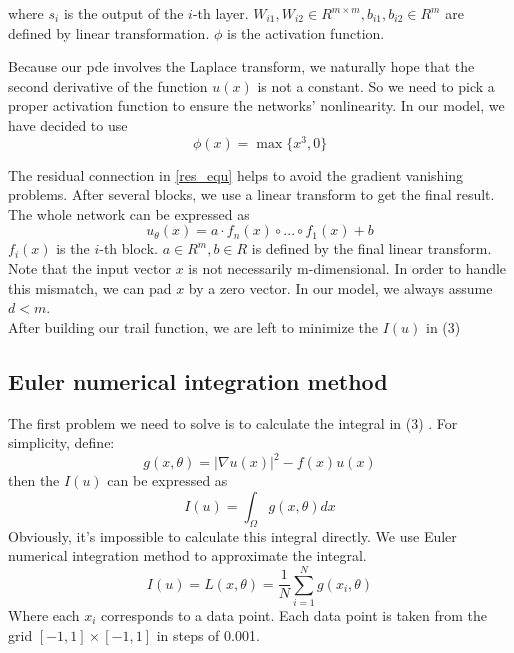 \documentclass{article}
\begin{document}
where $s_{i}$ is the output of the $i$-th layer. $W_{i1},W_{i2}\in R^{m\times m},b_{i1},b_{i2}\in R^{m}$ are defined by linear transformation. $\phi$ is the activation function.

\par Because our pde involves the Laplace transform, we naturally hope that the second derivative of the function $u(x)$ is not a constant. So we need to pick a proper activation function to ensure the networks' nonlinearity. In our model, we have decided to use 
\begin{equation}
\phi(x)=\max\{x^3,0\}
\end{equation}

\par The residual connection in \ref{res_equ} %
helps to avoid the gradient vanishing problems.
After several blocks, we use a linear transform to get the final result. The whole network can be expressed as
\begin{equation}
u_{\theta}(x)=a\cdot f_n(x) \circ ...\circ f_1(x)+b
\end{equation}
$f_i(x)$ is the $i$-th block. $a\in R^m,b\in R$ is defined by the final linear transform. Note that the input vector $x$ is not necessarily m-dimensional. In order to handle this mismatch, we can pad $x$ by a zero vector. In our model, we always assume $d<m$.\\
After building our trail function, we are left to minimize the $I(u)$ in (3)%
\subsection{Euler numerical integration method}
The first problem we need to solve is to calculate the integral in (3)%
 . For simplicity, define:
 \begin{equation}
 g(x,\theta)=|\nabla u(x)|^2-f(x)u(x)
 \end{equation}
 then the $I(u)$ can be expressed as
 \begin{equation}
 I(u)=\int _{\Omega}g(x,\theta)dx
 \end{equation}
 Obviously, it's impossible to calculate this integral directly. We use Euler numerical integration method to approximate the integral.
 \begin{equation}
 I(u)=L(x,\theta)=\frac{1}{N}\sum\limits_{i=1}^{N}g(x_i,\theta)
 \end{equation}
 Where each $x_i$ corresponds to a data point. Each data point is taken from the grid $[-1,1]\times [-1,1]$ in steps of 0.001.
\end{document}
